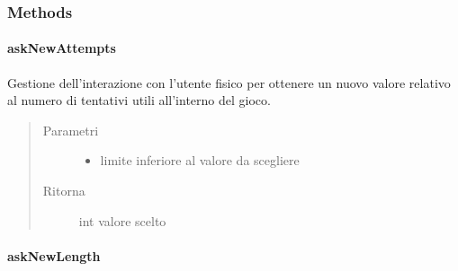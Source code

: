 \documentclass[letterpaper,10pt,italian,openany,oneside]{sphinxmanual}
\begin{document}
\subsubsection{Methods}
\label{\detokenize{source/it/unicam/cs/pa/mastermind/ui/StartView:methods}}

\paragraph{askNewAttempts}
\label{\detokenize{source/it/unicam/cs/pa/mastermind/ui/StartView:asknewattempts}}

\begin{fulllineitems}
\label{\detokenize{source/it/unicam/cs/pa/mastermind/ui/StartView:it.unicam.cs.pa.mastermind.ui.StartView.askNewAttempts(int)}}
Gestione dell’interazione con l’utente fisico per ottenere un nuovo valore relativo al numero di tentativi utili all’interno del gioco.
\begin{quote}\begin{description}
\item[{Parametri}] \leavevmode\begin{itemize}
\item {} 
 \textendash{} limite inferiore al valore da scegliere

\end{itemize}

\item[{Ritorna}] \leavevmode
int valore scelto

\end{description}\end{quote}

\end{fulllineitems}



\paragraph{askNewLength}
\label{\detokenize{source/it/unicam/cs/pa/mastermind/ui/StartView:asknewlength}}
\end{document}
